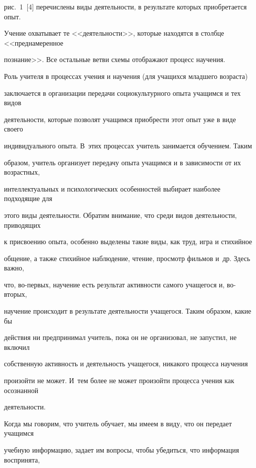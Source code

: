 рис.~1~[4] перечислены виды деятельности, в результате которых приобретается опыт. 


Учение охватывает те <<деятельности>>, которые находятся в столбце <<преднамеренное 


познание>>. Все остальные ветви схемы отображают процесс научения.





Роль учителя в процессах учения и научения (для учащихся младшего возраста) 


заключается в организации передачи социокультурного опыта учащимся и тех видов 


деятельности, которые позволят учащимся приобрести этот опыт уже в виде своего 


индивидуального опыта. В~этих процессах учитель занимается обучением. Таким 


образом, учитель организует передачу опыта учащимся и в зависимости от их возрастных, 


интеллектуальных и психологических особенностей выбирает наиболее подходящие для 


этого виды деятельности. Обратим внимание, что среди видов деятельности, приводящих 


к присвоению опыта, особенно выделены такие виды, как труд, игра и стихийное 


общение, а также стихийное наблюдение, чтение, просмотр фильмов и~др. Здесь важно, 


что, во-первых, научение есть результат активности самого учащегося и, во-вторых, 


научение происходит в результате деятельности учащегося. Таким образом, какие бы 


действия ни предпринимал учитель, пока он не организовал, не запустил, не включил 


собственную активность и деятельность учащегося, никакого процесса научения 


произойти не может. И~тем более не может произойти процесса учения как осознанной 


деятельности.








Когда мы говорим, что учитель обучает, мы имеем в виду, что он передает учащимся 


учебную информацию, задает им вопросы, чтобы убедиться, что информация воспринята, 


